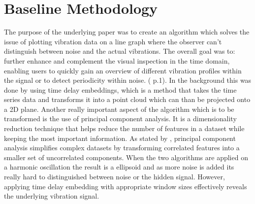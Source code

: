 \section{Baseline Methodology}
The purpose of the underlying paper was to create an algorithm which solves the issue of plotting vibration data on a line graph where the observer can't distinguish between noise and the actual vibrations. The overall goal was to: further enhance and complement the visual inspection in the time
domain, enabling users to quickly gain an overview of different
vibration profiles within the signal or to detect periodicity within
noise. (\cite{rakuschek2025visual} p.1). In the background this was done by using  time delay embeddings, which is a method that takes the time series data and transforms it into a point cloud which can than be projected onto a 2D plane. Another really important aspect of the algorithm which is to be transformed is the use of principal component analysis. It is a dimensionality reduction technique that helps reduce the number of features in a dataset while keeping the most important information. As stated by \textcite{KarlPearson}, principal component analysis simplifies complex datasets by transforming correlated features into a smaller set of uncorrelated components. When the two algorithms are applied on a harmonic oscillation the result is a ellipsoid and as more noise is added its really hard to distinguished between noise or the hidden signal. However, applying time delay embedding with appropriate window sizes effectively reveals the underlying vibration signal.